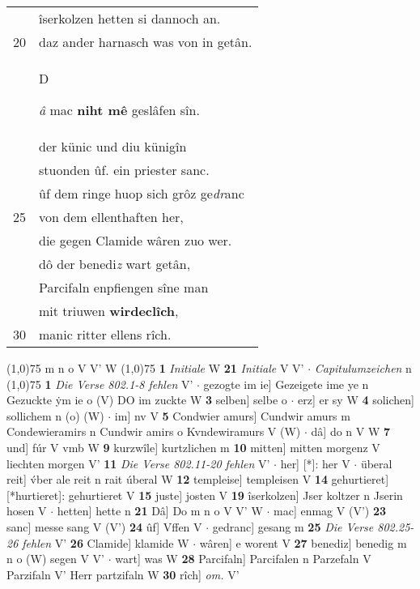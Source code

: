 \documentclass[8pt,a4paper,notitlepage]{article}
\begin{document}
\begin{table}[ht]
\begin{minipage}[t]{0.5\linewidth}
\begin{tabular}{rl}
 & îserkolzen hetten si dannoch an.\\ 
20 & daz ander harnasch was von in getân.\\ 
 & \begin{large}D\end{large}\textit{â} mac \textbf{niht mê} geslâfen sîn.\\ 
 & der künic und diu künigîn\\ 
 & stuonden ûf. ein priester sanc.\\ 
 & ûf dem ringe huop sich grôz ge\textit{dr}anc\\ 
25 & von dem ellenthaften her,\\ 
 & die gegen Clamide wâren zuo wer.\\ 
 & dô der benedi\textit{z} wart getân,\\ 
 & Parcifaln enpfiengen sîne man\\ 
 & mit triuwen \textbf{wirdeclîch},\\ 
30 & manic ritter ellens rîch.\\ 
\end{tabular}
\scriptsize
\line(1,0){75} \newline
m n o V V' W \newline
\line(1,0){75} \newline
\textbf{1} \textit{Initiale} W  \textbf{21} \textit{Initiale} V V'   $\cdot$ \textit{Capitulumzeichen} n  \newline
\line(1,0){75} \newline
\textbf{1} \textit{Die Verse 802.1-8 fehlen} V'   $\cdot$ gezogte im ie] Gezeigete ime ye n Gezuckte ẏm ie o (V) DO im zuckte W \textbf{3} selben] selbe o  $\cdot$ erz] er sy W \textbf{4} solichen] sollichem n (o) (W)  $\cdot$ im] nv V \textbf{5} Condwier amurs] Cundwir amurs m Condewieramirs n Cundwir amirs o Kvndewiramurs V (W)  $\cdot$ dâ] do n V W \textbf{7} und] fúr V vmb W \textbf{9} kurzwîle] kurtzlichen m \textbf{10} mitten] mitten morgenz V liechten morgen V' \textbf{11} \textit{Die Verse 802.11-20 fehlen} V'   $\cdot$ her] [*]: her V  $\cdot$ überal reit] v́ber ale reit n rait úberal W \textbf{12} templeise] templeisen V \textbf{14} gehurtieret] [*hurtieret]: gehurtieret V \textbf{15} juste] josten V \textbf{19} îserkolzen] Jser koltzer n Jserin hosen V  $\cdot$ hetten] hette n \textbf{21} Dâ] Do m n o V V' W  $\cdot$ mac] enmag V (V') \textbf{23} sanc] messe sang V (V') \textbf{24} ûf] Vffen V  $\cdot$ gedranc] gesang m \textbf{25} \textit{Die Verse 802.25-26 fehlen} V'  \textbf{26} Clamide] klamide W  $\cdot$ wâren] e worent V \textbf{27} benediz] benedig m n o (W) segen V V'  $\cdot$ wart] was W \textbf{28} Parcifaln] Parcifalen n Parzefaln V Parzifaln V' Herr partzifaln W \textbf{30} rîch] \textit{om.} V' \newline
\end{minipage}
\end{table}
\end{document}
